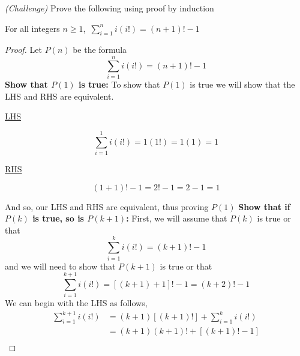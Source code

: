\documentclass[addpoints]{exam}
\begin{document}
\begin{questions}
    \question \textit{(Challenge)} Prove the following using proof by induction
    \begin{center}
      For all integers $n \geq 1$, $\displaystyle\,\sum\limits_{i=1}^{n} i\left(i\textbf{!}\right) = (n+1)\textbf{!} - 1$
    \end{center}
    \begin{solution}[\stretch{1}]
      \begin{proof}
        Let $P(n)$ be the formula 
        \[
          \sum\limits_{i=1}^{n} i\left(i\textbf{!}\right) = \left(n+1\right)\textbf{!} - 1
        \]
        \textbf{Show that $P(1)$ is true:} To show that $P(1)$ is true we will show that the LHS and RHS are equivalent. 
        \newline
        \begin{minipage}[t]{0.45\linewidth}
          \begin{center}
            \underline{LHS}
          \end{center}
          \[
            \sum\limits_{i=1}^{1} i\left(i\textbf{!}\right) = 1(1\textbf{!}) = 1(1) = 1
          \]
        \end{minipage}
        \hfill
        \begin{minipage}[t]{0.45\linewidth}
          \begin{center}
            \underline{RHS}
          \end{center}
          \[
            \left(1+1\right)\textbf{!} - 1 = 2\textbf{!} - 1 = 2 - 1 = 1
          \]
        \end{minipage}
        \newline And so, our LHS and RHS are equivalent, thus proving $P(1)$ 
        \newline\textbf{Show that if $P(k)$ is true, so is $P(k+1)$:} First, we will assume that $P(k)$ is true or that 
        \[
        \sum\limits_{i=1}^{k} i\left(i\textbf{!}\right) = \left(k+1\right)\textbf{!} - 1
        \]
        and we will need to show that $P(k+1)$ is true or that 
        \[
        \sum\limits_{i=1}^{k+1} i\left(i\textbf{!}\right) = \left[\left(k+1\right)+1\right]\textbf{!}-1 = \left(k+2\right)\textbf{!} - 1
        \]
        We can begin with the LHS as follows, 
        \begin{align*}
          \sum\limits_{i=1}^{k+1} i\left(i\textbf{!}\right) &= \left(k+1\right)\left[\left(k+1\right)\textbf{!}\right] + \sum\limits_{i=1}^{k} i\left(i\textbf{!}\right) \\ 
          &= \left(k+1\right)\left(k+1\right)\textbf{!} + \left[\left(k+1\right)\textbf{!} - 1\right] \\ 

\end{align*}
\end{proof}
\end{solution}
\end{questions}
\end{document}
